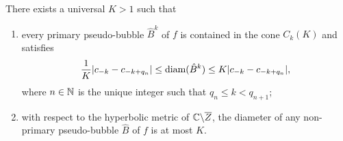 \documentclass{amsart}
\begin{document}
\begin{theorem}
\label{thm:pseudo-bubble-bounds}
    There exists a universal $K>1$ such that 
    \begin{enumerate}[label=\textnormal{(\arabic*)}]
        \item every primary pseudo-bubble $\hat{B}^{k}$ of $f$ is contained in the cone $C_k(K)$ and satisfies
        \[
            \frac{1}{K} |c_{-k} - c_{-k+q_{n}}| \leq \textnormal{diam}(\hat{B}^{k}) \leq K |c_{-k} - c_{-k+q_{n}}|,
        \]
        where $n \in \mathbb{N}$ is the unique integer such that $q_n \leq k < q_{n+1}$;
        \item with respect to the hyperbolic metric of $\mathbb{C} \backslash \overline{Z}$, the diameter of any non-primary pseudo-bubble $\hat{B}$ of $f$ is at most $K$.
    \end{enumerate}
\end{theorem}
\end{document}
